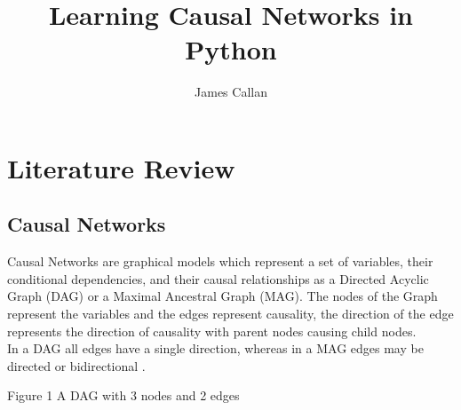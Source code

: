 \documentclass{article}
\begin{document}
\title{Learning Causal Networks in Python}
\author{James Callan}
\date{}

\maketitle

\newpage

\section{Literature Review}

\subsection{Causal Networks}

Causal Networks are graphical models which represent a set of variables, their conditional dependencies, and their causal relationships\cite{verma1990causal} as a Directed Acyclic Graph (DAG) or a Maximal Ancestral Graph (MAG). The nodes of the Graph represent the variables and the edges represent causality, the direction of the edge represents the direction of causality with parent nodes causing child nodes\cite{verma1990causal}. 
\\

In a DAG all edges have a single direction, whereas in a MAG edges may be directed or bidirectional \cite{zhang2008causal}.
\\

\begin{center}
\end{center}

\begin{center}
Figure 1 A DAG with 3 nodes and 2 edges
\end{center}

\begin{center}
\\
\end{center}
\end{document}
